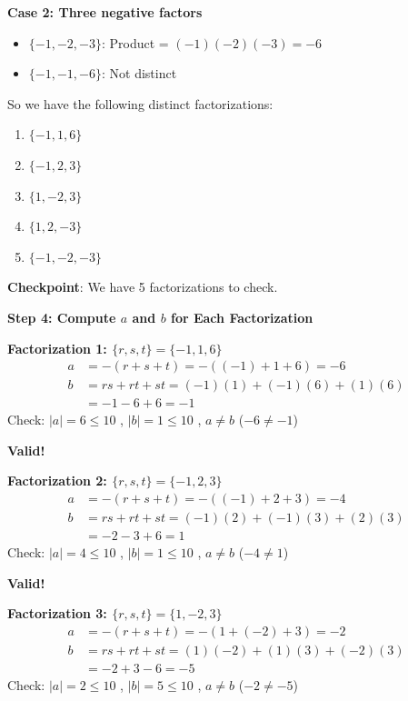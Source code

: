 \documentclass[12pt]{article}
\begin{document}
\begin{solutionbox}
\textbf{Case 2: Three negative factors}

\begin{itemize}
    \item $\{-1, -2, -3\}$: Product = $(-1)(-2)(-3) = -6$ \checkmark
    \item $\{-1, -1, -6\}$: Not distinct
\end{itemize}

So we have the following distinct factorizations:
\begin{enumerate}
    \item $\{-1, 1, 6\}$
    \item $\{-1, 2, 3\}$
    \item $\{1, -2, 3\}$
    \item $\{1, 2, -3\}$
    \item $\{-1, -2, -3\}$
\end{enumerate}

\textbf{Checkpoint}: We have 5 factorizations to check.

\vspace{0.3cm}

\textbf{Step 4: Compute $a$ and $b$ for Each Factorization}

\textbf{Factorization 1: $\{r, s, t\} = \{-1, 1, 6\}$}
\begin{align*}
    a &= -(r + s + t) = -((-1) + 1 + 6) = -6 \\
    b &= rs + rt + st = (-1)(1) + (-1)(6) + (1)(6) \\
      &= -1 - 6 + 6 = -1
\end{align*}
Check: $|a| = 6 \leq 10$ \checkmark, $|b| = 1 \leq 10$ \checkmark, $a \neq b$ ($-6 \neq -1$) \checkmark

\textbf{Valid!}

\vspace{0.2cm}

\textbf{Factorization 2: $\{r, s, t\} = \{-1, 2, 3\}$}
\begin{align*}
    a &= -(r + s + t) = -((-1) + 2 + 3) = -4 \\
    b &= rs + rt + st = (-1)(2) + (-1)(3) + (2)(3) \\
      &= -2 - 3 + 6 = 1
\end{align*}
Check: $|a| = 4 \leq 10$ \checkmark, $|b| = 1 \leq 10$ \checkmark, $a \neq b$ ($-4 \neq 1$) \checkmark

\textbf{Valid!}

\vspace{0.2cm}

\textbf{Factorization 3: $\{r, s, t\} = \{1, -2, 3\}$}
\begin{align*}
    a &= -(r + s + t) = -(1 + (-2) + 3) = -2 \\
    b &= rs + rt + st = (1)(-2) + (1)(3) + (-2)(3) \\
      &= -2 + 3 - 6 = -5
\end{align*}
Check: $|a| = 2 \leq 10$ \checkmark, $|b| = 5 \leq 10$ \checkmark, $a \neq b$ ($-2 \neq -5$) \checkmark


\end{solutionbox}
\end{document}
